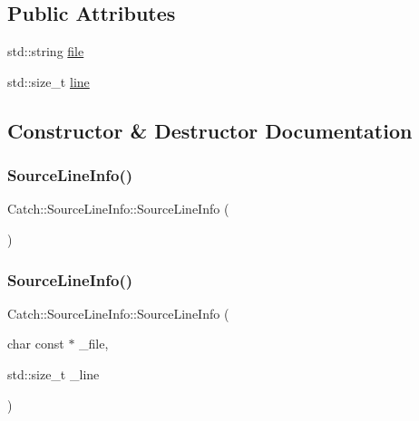 \subsection*{Public Attributes}
\begin{DoxyCompactItemize}
\item 
std\+::string \hyperlink{struct_catch_1_1_source_line_info_adf3ccf0c2bd326eb3466318af82a94dd}{file}
\item 
std\+::size\+\_\+t \hyperlink{struct_catch_1_1_source_line_info_a841e5d696c7b9cde24e45e61dd979c77}{line}
\end{DoxyCompactItemize}


\subsection{Constructor \& Destructor Documentation}
\hypertarget{struct_catch_1_1_source_line_info_a9d44b2e1133794eee0bd5716424c83d6}{}\label{struct_catch_1_1_source_line_info_a9d44b2e1133794eee0bd5716424c83d6} 
\subsubsection{\texorpdfstring{Source\+Line\+Info()}{SourceLineInfo()}\hspace{0.1cm}{\footnotesize\ttfamily [1/3]}}
{\footnotesize\ttfamily Catch\+::\+Source\+Line\+Info\+::\+Source\+Line\+Info (\begin{DoxyParamCaption}{ }\end{DoxyParamCaption})}

\hypertarget{struct_catch_1_1_source_line_info_a6218cb890337d37f708ea94063958940}{}\label{struct_catch_1_1_source_line_info_a6218cb890337d37f708ea94063958940} 
\subsubsection{\texorpdfstring{Source\+Line\+Info()}{SourceLineInfo()}\hspace{0.1cm}{\footnotesize\ttfamily [2/3]}}
{\footnotesize\ttfamily Catch\+::\+Source\+Line\+Info\+::\+Source\+Line\+Info (\begin{DoxyParamCaption}\item[{char const $\ast$}]{\+\_\+file,  }\item[{std\+::size\+\_\+t}]{\+\_\+line }\end{DoxyParamCaption})}

